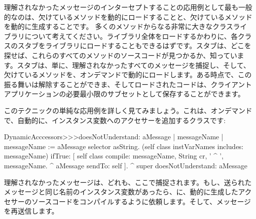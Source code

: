 \documentclass[a4paper,10pt,twoside]{book}
\begin{document}
理解されなかったメッセージのインターセプトすることの応用例として最も一般的なのは、欠けているメソッドを動的にロードすることと、欠けているメソッドを動的に生成することです。
多くのメソッドからなる非常に大きなクラスライブラリについて考えてください。ライブラリ全体をロードするかわりに、各クラスのスタブをライブラリにロードすることもできるはずです。スタブは、どこを探せば、これらのすべてのメソッドのソースコードが見つかるか、知っています。スタブは、単に、理解されなかったすべてのメッセージを捕捉し、そして、欠けているメソッドを、オンデマンドで動的にロードします。ある時点で、この振る舞いは解除することができま、そしてロードされたコードは、クライアントアプリケーションの必要最小限のサブセットとして保存することができます。


このテクニックの単純な応用例を詳しく見てみましょう。これは、オンデマンドで、自動的に、インスタンス変数へのアクセサーを追加するクラスです: %

\begin{code}{}
DynamicAcccessors>>>doesNotUnderstand: aMessage
	| messageName |
	messageName := aMessage selector asString.
	(self class instVarNames includes: messageName)
		ifTrue: [
			self class compile: messageName, String cr, ' ^ ', messageName.
			^ aMessage sendTo: self ].
	^ super doesNotUnderstand: aMessage
\end{code}
理解されなかったメッセージは、どれも、ここで捕捉されます。もし、送られたメッセージと同じ名前のインスタンス変数があったら、に、動的に生成したアクセサーのソースコードをコンパイルするように依頼します。そして、メッセージを再送信します。
\end{document}
